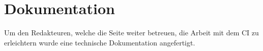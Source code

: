 \section{Dokumentation}
\label{sec:Dokumentation}


Um den Redakteuren, welche die Seite weiter betreuen, die Arbeit mit dem \acs{CI} zu erleichtern wurde eine technische Dokumentation angefertigt.
